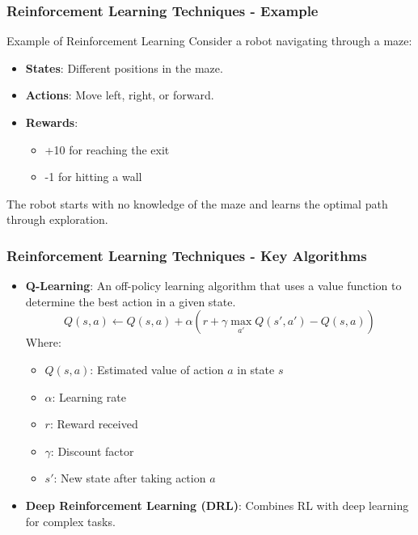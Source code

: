 \documentclass[aspectratio=169]{beamer}
\begin{document}
\begin{frame}[fragile]
  \frametitle{Reinforcement Learning Techniques - Example}
  \begin{block}{Example of Reinforcement Learning}
    Consider a robot navigating through a maze:
    \begin{itemize}
      \item \textbf{States}: Different positions in the maze.
      \item \textbf{Actions}: Move left, right, or forward.
      \item \textbf{Rewards}: 
      \begin{itemize}
        \item +10 for reaching the exit
        \item -1 for hitting a wall
      \end{itemize}
    \end{itemize}
    The robot starts with no knowledge of the maze and learns the optimal path through exploration.
  \end{block}
\end{frame}

\begin{frame}[fragile]
  \frametitle{Reinforcement Learning Techniques - Key Algorithms}
  \begin{itemize}
    \item \textbf{Q-Learning}: 
      An off-policy learning algorithm that uses a value function to determine the best action in a given state.
      \begin{equation}
        Q(s, a) \leftarrow Q(s, a) + \alpha \left( r + \gamma \max_{a'} Q(s', a') - Q(s, a) \right)
      \end{equation}
      Where:
      \begin{itemize}
        \item \( Q(s, a) \): Estimated value of action \( a \) in state \( s \)
        \item \( \alpha \): Learning rate
        \item \( r \): Reward received
        \item \( \gamma \): Discount factor
        \item \( s' \): New state after taking action \( a \)
      \end{itemize}
    \item \textbf{Deep Reinforcement Learning (DRL)}: Combines RL with deep learning for complex tasks.
  \end{itemize}
\end{frame}
\end{document}
